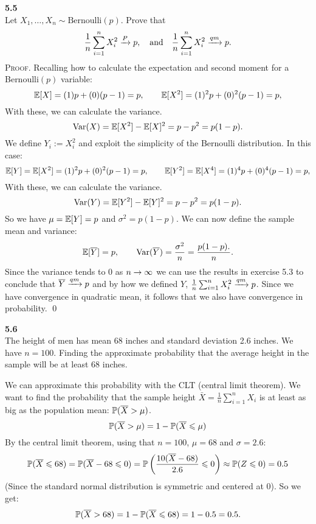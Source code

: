 \newpage\noindent
\textbf{5.5}\\  %
Let $X_1,\ldots,X_n\sim\text{Bernoulli}(p)$. Prove that
$$
\frac{1}{n}\sum_{i=1}^n X_i^2 \raP p,
\quad\text{and}\quad
\frac{1}{n}\sum_{i=1}^n X_i^2 \raQ p.
$$
\textsc{Proof}. Recalling how to calculate the expectation and second moment
for a Bernoulli$(p)$ variable:
$$
\E[X] = (1)p + (0)(p-1) = p,
\qquad
\E[X^2] = (1)^2p + (0)^2(p-1) = p,
$$
With these, we can calculate the variance.
$$
\V(X) = \E[X^2] - \E[X]^2 = p - p^2 = p(1 - p).
$$
We define $Y_i := X_i^2$ and exploit the simplicity of the Bernoulli distribution.
In this case:
$$
\E[Y] = \E[X^2] = (1)^2p + (0)^2(p-1) = p,
\qquad
\E[Y^2] = \E[X^4] = (1)^4p + (0)^4(p-1) = p,
$$
With these, we can calculate the variance.
$$
\V(Y) = \E[Y^2] - \E[Y]^2 = p - p^2 = p(1 - p).
$$
So we have $\mu = \E[Y] = p$ and $\sigma^2 = p(1-p)$.
We can now define the sample mean and variance:
$$
\E[\bar{Y}] = p,\qquad \V(\bar{Y}) = \frac{\sigma^2}{n} = \frac{p(1 - p).}{n}.
$$
Since the variance tends to 0 as $n\ra\infty$ we can use the results in exercise 5.3
to conclude that $\bar{Y}\raQ p$ and by how we defined $Y$, $\frac{1}{n}\sum_{i=1}^n X_i^2 \raQ p$.
Since we have convergence in quadratic mean, it follows that we also have convergence
in probability. \qed

\bigskip\noindent
\textbf{5.6}\\  %
The height of men has mean 68 inches and standard deviation 2.6 inches. We have $n=100$.
Finding the approximate probability that the average height in the sample will
be at least 68 inches.

 We can approximate this probability with the CLT (central limit theorem). We want to
 find the probability that the sample height $\bar{X} = \frac{1}{n}\sum_{i=1}^n X_i$
 is at least as big as the population mean: $\P(\bar{X} > \mu)$. 
 $$
 \P(\bar{X} > \mu) =
 1 - \P(\bar{X} \leq \mu) %
 $$
 By the central limit
 theorem, using that $n=100$, $\mu = 68$ and $\sigma = 2.6$:
 $$
 \P(\bar{X} \leq 68) =
 \P(\bar{X} - 68\leq 0) =
 \P\left(\frac{10(\bar{X} - 68)}{2.6} \leq 0\right) \approx
 \P(Z\leq 0) = 0.5
 $$
 (Since the standard normal distribution is symmetric and centered at 0).
 So we get:
 $$
 \P(\bar{X} > 68) =
 1 - \P(\bar{X}\leq 68) = 1 - 0.5 = 0.5.
 $$


